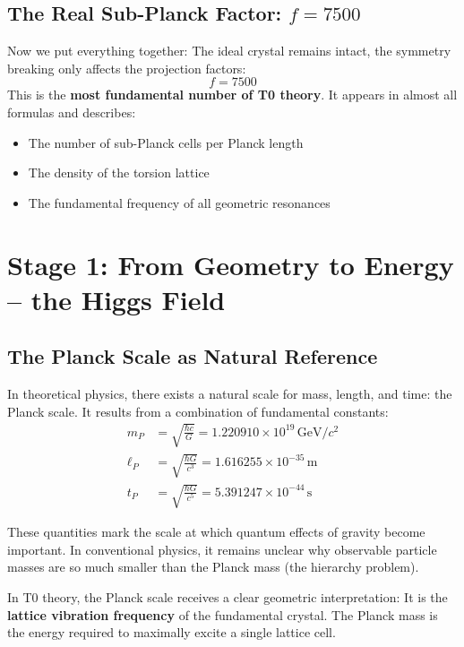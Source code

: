 	\subsection{The Real Sub-Planck Factor: \(f = 7500\)}
	Now we put everything together: The ideal crystal remains intact, the symmetry breaking only affects the projection factors:
	\begin{equation}
		\boxed{f = 7500}
	\end{equation}
	This is the \textbf{most fundamental number of T0 theory}. It appears in almost all formulas and describes:
	\begin{itemize}
		\item The number of sub-Planck cells per Planck length
		\item The density of the torsion lattice
		\item The fundamental frequency of all geometric resonances
	\end{itemize}
	\section{Stage 1: From Geometry to Energy -- the Higgs Field}
	
	\subsection{The Planck Scale as Natural Reference}
	
	In theoretical physics, there exists a natural scale for mass, length, and time: the Planck scale. It results from a combination of fundamental constants:
	\begin{align}
		m_P &= \sqrt{\frac{\hbar c}{G}} = 1.220910 \times 10^{19}\,\text{GeV}/c^2 \\
		\ell_P &= \sqrt{\frac{\hbar G}{c^3}} = 1.616255 \times 10^{-35}\,\text{m} \\
		t_P &= \sqrt{\frac{\hbar G}{c^5}} = 5.391247 \times 10^{-44}\,\text{s}
	\end{align}
	
	These quantities mark the scale at which quantum effects of gravity become important. In conventional physics, it remains unclear why observable particle masses are so much smaller than the Planck mass (the hierarchy problem).
	
	In T0 theory, the Planck scale receives a clear geometric interpretation: It is the \textbf{lattice vibration frequency} of the fundamental crystal. The Planck mass is the energy required to maximally excite a single lattice cell.
	
